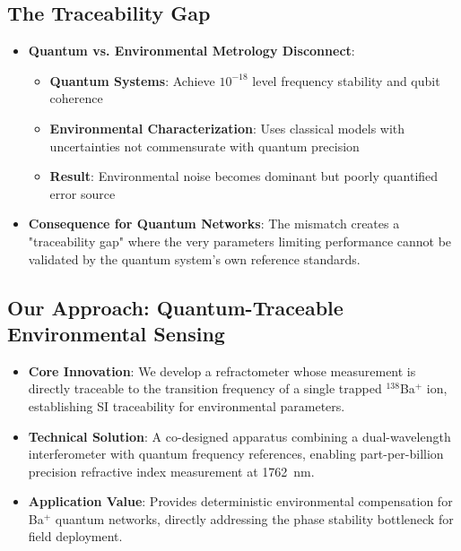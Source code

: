 \documentclass[aip,reprint,groupedaddress,onecolumn,superscriptaddress]{revtex4-2}
\begin{document}
\subsection{The Traceability Gap}
\begin{itemize}
    \item \textbf{Quantum vs. Environmental Metrology Disconnect}:
    \begin{itemize}
        \item \textbf{Quantum Systems}: Achieve $10^{-18}$ level frequency stability and qubit coherence
        \item \textbf{Environmental Characterization}: Uses classical models with uncertainties not commensurate with quantum precision
        \item \textbf{Result}: Environmental noise becomes dominant but poorly quantified error source
    \end{itemize}
    
    \item \textbf{Consequence for Quantum Networks}: The mismatch creates a "traceability gap" where the very parameters limiting performance cannot be validated by the quantum system's own reference standards.
\end{itemize}

\subsection{Our Approach: Quantum-Traceable Environmental Sensing}
\begin{itemize}
    \item \textbf{Core Innovation}: We develop a refractometer whose measurement is directly traceable to the transition frequency of a single trapped $^{138}$Ba$^+$ ion, establishing SI traceability for environmental parameters.
    
    \item \textbf{Technical Solution}: A co-designed apparatus combining a dual-wavelength interferometer with quantum frequency references, enabling part-per-billion precision refractive index measurement at \SI{1762}{\nano\meter}.
    
    \item \textbf{Application Value}: Provides deterministic environmental compensation for Ba$^+$ quantum networks, directly addressing the phase stability bottleneck for field deployment.
\end{itemize}

\end{document}

